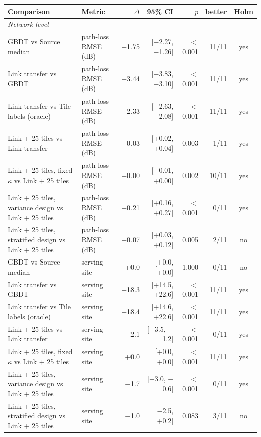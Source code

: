 \begin{tabular}{llrrrrc}
\toprule
Comparison & Metric & $\Delta$ & 95\% CI & $p$ & better & Holm \\
\midrule
\multicolumn{7}{l}{\emph{Network level}} \\
GBDT vs Source median & path-loss RMSE (dB) & \ensuremath{-}1.75 & [\ensuremath{-}2.27, \ensuremath{-}1.26] & $<$0.001 & 11/11 & yes \\
Link transfer vs GBDT & path-loss RMSE (dB) & \ensuremath{-}3.44 & [\ensuremath{-}3.83, \ensuremath{-}3.10] & $<$0.001 & 11/11 & yes \\
Link transfer vs Tile labels (oracle) & path-loss RMSE (dB) & \ensuremath{-}2.33 & [\ensuremath{-}2.63, \ensuremath{-}2.08] & $<$0.001 & 11/11 & yes \\
Link + 25 tiles vs Link transfer & path-loss RMSE (dB) & +0.03 & [+0.02, +0.04] & 0.003 & 1/11 & yes \\
Link + 25 tiles, fixed $\kappa$ vs Link + 25 tiles & path-loss RMSE (dB) & +0.00 & [\ensuremath{-}0.01, +0.00] & 0.002 & 10/11 & yes \\
Link + 25 tiles, variance design vs Link + 25 tiles & path-loss RMSE (dB) & +0.21 & [+0.16, +0.27] & $<$0.001 & 0/11 & yes \\
Link + 25 tiles, stratified design vs Link + 25 tiles & path-loss RMSE (dB) & +0.07 & [+0.03, +0.12] & 0.005 & 2/11 & no \\
GBDT vs Source median & serving site & +0.0 & [+0.0, +0.0] & 1.000 & 0/11 & no \\
Link transfer vs GBDT & serving site & +18.3 & [+14.5, +22.6] & $<$0.001 & 11/11 & yes \\
Link transfer vs Tile labels (oracle) & serving site & +18.4 & [+14.6, +22.6] & $<$0.001 & 11/11 & yes \\
Link + 25 tiles vs Link transfer & serving site & \ensuremath{-}2.1 & [\ensuremath{-}3.5, \ensuremath{-}1.2] & $<$0.001 & 0/11 & yes \\
Link + 25 tiles, fixed $\kappa$ vs Link + 25 tiles & serving site & +0.0 & [+0.0, +0.0] & $<$0.001 & 11/11 & yes \\
Link + 25 tiles, variance design vs Link + 25 tiles & serving site & \ensuremath{-}1.7 & [\ensuremath{-}3.0, \ensuremath{-}0.6] & $<$0.001 & 0/11 & yes \\
Link + 25 tiles, stratified design vs Link + 25 tiles & serving site & \ensuremath{-}1.0 & [\ensuremath{-}2.5, +0.2] & 0.083 & 3/11 & no \\

\end{tabular}

